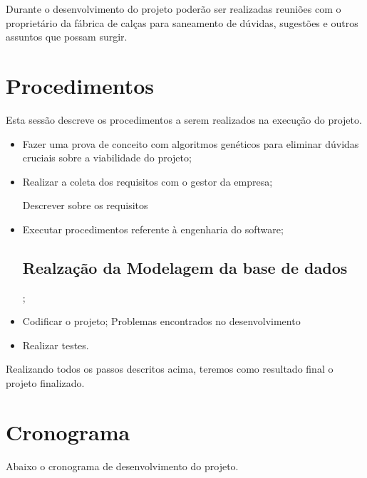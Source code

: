 \par Durante o desenvolvimento do projeto poderão ser realizadas reuniões
com o proprietário da fábrica de calças para saneamento de dúvidas, sugestões e
outros assuntos que possam surgir.

\section{Procedimentos}

\par Esta sessão descreve os procedimentos a serem realizados na execução do
projeto.

 \begin{itemize}

	\item Fazer uma prova de conceito com algoritmos genéticos para eliminar
	dúvidas cruciais sobre a viabilidade do projeto;
	  
	\item Realizar a coleta dos requisitos com o gestor da empresa;
	\par Descrever sobre os requisitos
	
	\item Executar procedimentos referente à engenharia do software;
	
	\subsection{Realzação da Modelagem da base de dados};
	
	
	\item Codificar o projeto;
	 Problemas encontrados no desenvolvimento

	\item Realizar testes.
	 
 \end{itemize}
 
 \par Realizando todos os passos descritos acima, teremos como resultado final o
 projeto finalizado.

\newpage

\section{Cronograma}

\par Abaixo o cronograma de desenvolvimento do projeto.

